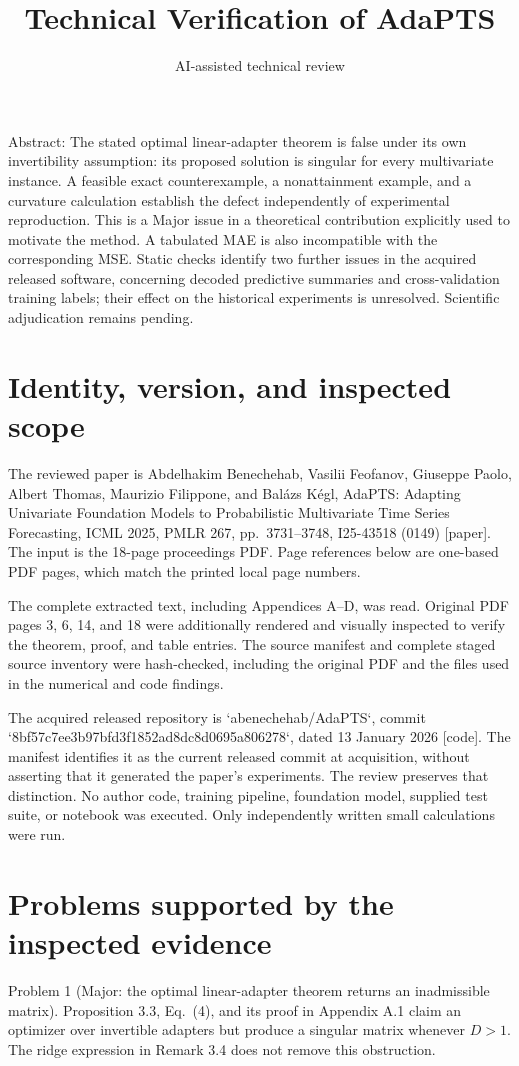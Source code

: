 \documentclass[10pt]{article}
\title{Technical Verification of AdaPTS}
\author{AI-assisted technical review}
\date{}
\begin{document}
\maketitle
Abstract: The stated optimal linear-adapter theorem is false under its own invertibility assumption: its proposed solution is singular for every multivariate instance. A feasible exact counterexample, a nonattainment example, and a curvature calculation establish the defect independently of experimental reproduction. This is a Major issue in a theoretical contribution explicitly used to motivate the method. A tabulated MAE is also incompatible with the corresponding MSE. Static checks identify two further issues in the acquired released software, concerning decoded predictive summaries and cross-validation training labels; their effect on the historical experiments is unresolved. Scientific adjudication remains pending.\par
\section*{Identity, version, and inspected scope}
The reviewed paper is Abdelhakim Benechehab, Vasilii Feofanov, Giuseppe Paolo, Albert Thomas, Maurizio Filippone, and Balázs Kégl, AdaPTS: Adapting Univariate Foundation Models to Probabilistic Multivariate Time Series Forecasting, ICML 2025, PMLR 267, pp. 3731–3748, I25-43518 (0149) [paper]. The input is the 18-page proceedings PDF. Page references below are one-based PDF pages, which match the printed local page numbers.\par
The complete extracted text, including Appendices A–D, was read. Original PDF pages 3, 6, 14, and 18 were additionally rendered and visually inspected to verify the theorem, proof, and table entries. The source manifest and complete staged source inventory were hash-checked, including the original PDF and the files used in the numerical and code findings.\par
The acquired released repository is `abenechehab/AdaPTS`, commit `8bf57c7ee3b97bfd3f1852ad8dc8d0695a806278`, dated 13 January 2026 [code]. The manifest identifies it as the current released commit at acquisition, without asserting that it generated the paper’s experiments. The review preserves that distinction. No author code, training pipeline, foundation model, supplied test suite, or notebook was executed. Only independently written small calculations were run.\par
\section*{Problems supported by the inspected evidence}
Problem 1 (Major: the optimal linear-adapter theorem returns an inadmissible matrix).  Proposition 3.3, Eq. (4), and its proof in Appendix A.1 claim an optimizer over invertible adapters but produce a singular matrix whenever \(D>1\). The ridge expression in Remark 3.4 does not remove this obstruction.\par
\end{document}
